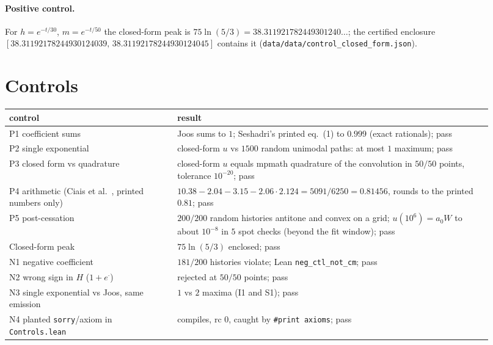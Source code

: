 \documentclass[10pt]{article}
\newcommand{\lean}[1]{\texttt{#1}}
\theoremstyle{plain}
\begin{document}
\paragraph{Positive control.} For $h=e^{-t/30}$, $m=e^{-t/50}$ the closed-form peak is $75\ln(5/3)=38.311921782449301240\dots$; the certified enclosure $[38.31192178244930124039,\,38.31192178244930124045]$ contains it (\texttt{data/data/control\_closed\_form.json}).

\section{Controls}\label{sec:controls}
\begin{center}\small\begin{tabular}{p{0.32\linewidth}p{0.6\linewidth}}\toprule
control & result\\\midrule
P1 coefficient sums & Joos sums to $1$; Seshadri's printed eq.~(1) to $0.999$ (exact rationals); pass\\
P2 single exponential & closed-form $u$ vs $1500$ random unimodal paths: at most $1$ maximum; pass\\
P3 closed form vs quadrature & closed-form $u$ equals mpmath quadrature of the convolution in $50/50$ points, tolerance $10^{-20}$; pass\\
P4 arithmetic (Ciais et al.~\cite{ciais}, printed numbers only) & $10.38-2.04-3.15-2.06\cdot2.124=5091/6250=0.81456$, rounds to the printed $0.81$; pass\\
P5 post-cessation & $200/200$ random histories antitone and convex on a grid; $u(10^6)=a_0W$ to about $10^{-8}$ in $5$ spot checks (beyond the fit window); pass\\
Closed-form peak & $75\ln(5/3)$ enclosed; pass\\
N1 negative coefficient & $181/200$ histories violate; Lean \lean{neg\_ctl\_not\_cm}; pass\\
N2 wrong sign in $H$ ($1+e^{\cdot}$) & rejected at $50/50$ points; pass\\
N3 single exponential vs Joos, same emission & $1$ vs $2$ maxima (I1 and S1); pass\\
N4 planted \lean{sorry}/axiom in \texttt{Controls.lean} & compiles, rc $0$, caught by \texttt{\#print axioms}; pass\\\bottomrule
\end{tabular}\end{center}
\end{document}
